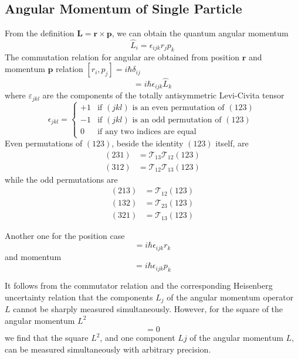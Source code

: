 \documentclass[../../../main.tex]{subfiles}
\begin{document}
\subsection{Angular Momentum of Single Particle}
From the definition $\mathbf{L}= \mathbf{r} \times \mathbf{p}$, we can obtain the quantum angular momentum
\begin{equation*}
    \hat{L}_i = \epsilon_{ijk}r_jp_k
\end{equation*}
The commutation relation for angular are obtained from position $\mathbf{r}$ and momentum $\mathbf{p}$ relation $[r_i   , p_j]=i \hbar \delta_{ij}$
\begin{equation*}
    [\hat{L}_{i}, \hat{L}_{j}] = i \hbar \epsilon_{ijk} \hat{L}_{k}
\end{equation*}
where $\varepsilon_{jkl}$ are the components of the totally antisymmetric Levi-Civita tensor
\begin{equation*}
    \epsilon_{jkl} = \begin{cases}
        +1 & \text{if } (jkl) \text{ is an even permutation of } (123) \\
        -1 & \text{if } (jkl) \text{ is an odd permutation of } (123)  \\
        0  & \text{if any two indices are equal}
    \end{cases}
\end{equation*}
Even permutations of $(123)$, beside the identity $(123)$ itself, are
\begin{align*}
    (231) & =  \mathcal{T}_{13} \mathcal{T}_{12}(123) \\
    (312) & =  \mathcal{T}_{12} \mathcal{T}_{13}(123)
\end{align*}
while the odd permutations are
\begin{align*}
    (213) & =  \mathcal{T}_{12}(123) \\
    (132) & =  \mathcal{T}_{23}(123) \\
    (321) & =  \mathcal{T}_{13}(123)
\end{align*}

Another one for the position case
\begin{equation*}
    [r_{i}, \hat{L}_{j}] = i \hbar \epsilon_{ijk} r_{k}
\end{equation*}
and momentum
\begin{equation*}
    [p_{i}, \hat{L}_{j}] = i \hbar \epsilon_{ijk} p_{k}
\end{equation*}

It follows from the commutator relation and the corresponding Heisenberg uncertainty relation that the components $\hat{L}_j$ of the angular momentum operator $L$ cannot be sharply measured simultaneously.
However, for the square of the angular momentum $L^2$
\begin{equation*}
    [L^2,\hat{L}_j] = 0
\end{equation*}
we find that the square $L^2$, and one component $Lj$ of the angular momentum $L$, can be measured simultaneously with arbitrary precision.
\end{document}
